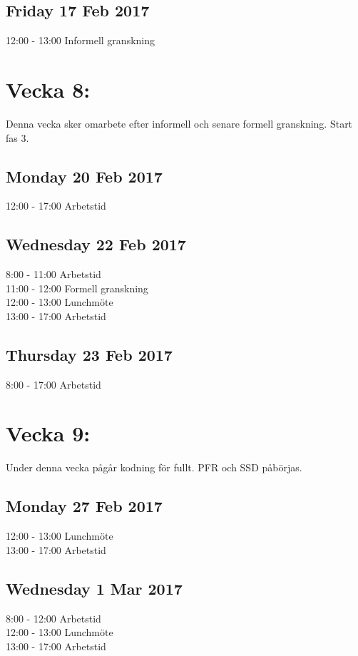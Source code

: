 \documentclass[paper=a4, fontsize=11pt,twoside]{article}
\begin{document}
\subsection*{Friday 17 Feb 2017}
	12:00 - 13:00 Informell granskning\\



\section*{Vecka 8:}
Denna vecka sker omarbete efter informell och senare formell granskning. Start
fas 3.\\
 \subsection*{Monday 20 Feb 2017}
	12:00 - 17:00 Arbetstid\\
\subsection*{Wednesday 22 Feb 2017}
	8:00 - 11:00 Arbetstid\\
	11:00 - 12:00 Formell granskning\\
	12:00 - 13:00 Lunchmöte\\
	13:00 - 17:00 Arbetstid\\
\subsection*{Thursday 23 Feb 2017}
	8:00 - 17:00 Arbetstid\\



\section*{Vecka 9:}
Under denna vecka pågår kodning för fullt. PFR och SSD påbörjas.\\
\subsection*{Monday 27 Feb 2017}
	12:00 - 13:00 Lunchmöte\\
	13:00 - 17:00 Arbetstid\\
\subsection*{Wednesday 1 Mar 2017}
	8:00 - 12:00 Arbetstid\\
	12:00 - 13:00 Lunchmöte\\
	13:00 - 17:00 Arbetstid\\
\end{document}
